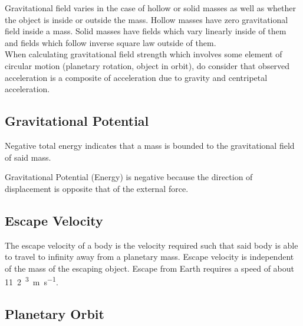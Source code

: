 \documentclass[../main]{subfiles}
\begin{document}
	Gravitational field varies in the case of hollow or solid masses as well as whether the object is inside or outside the mass. Hollow masses have zero gravitational field inside a mass. Solid masses have fields which vary linearly inside of them and fields which follow inverse square law outside of them. \\

	When calculating gravitational field strength which involves some element of circular motion (planetary rotation, object in orbit), do consider that observed acceleration is a composite of acceleration due to gravity and centripetal acceleration.

	\subsection{Gravitational Potential}


	Negative total energy indicates that a mass is bounded to the gravitational field of said mass.


	Gravitational Potential (Energy) is negative because the direction of displacement is opposite that of the external force. 

	\subsection{Escape Velocity}

	The escape velocity of a body is the velocity required such that said body is able to travel to infinity away from a planetary mass. Escape velocity is independent of the mass of the escaping object. Escape from Earth requires a speed of about \si{11.2 ^3 m s^{-1}}.


	\subsection{Planetary Orbit}
\end{document}

